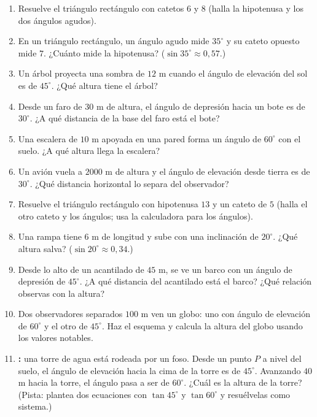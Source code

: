 \documentclass[12pt, letterpaper]{article}
\providecommand{\sen}{\sin}
\begin{document}
\begin{enumerate}[leftmargin=*, resume]
  \item \facil{} Resuelve el triángulo rectángulo con catetos $6$ y $8$ (halla la hipotenusa y los dos ángulos agudos).

  \item \facil{} En un triángulo rectángulo, un ángulo agudo mide $35^{\circ}$ y su cateto opuesto mide $7$. ¿Cuánto mide la hipotenusa? ($\sen 35^{\circ} \approx 0{,}57$.)

  \item \facil{} Un árbol proyecta una sombra de $12$ m cuando el ángulo de elevación del sol es de $45^{\circ}$. ¿Qué altura tiene el árbol?

  \item \medio{} Desde un faro de $30$ m de altura, el ángulo de depresión hacia un bote es de $30^{\circ}$. ¿A qué distancia de la base del faro está el bote?

  \item \medio{} Una escalera de $10$ m apoyada en una pared forma un ángulo de $60^{\circ}$ con el suelo. ¿A qué altura llega la escalera?

  \item \medio{} Un avión vuela a $2000$ m de altura y el ángulo de elevación desde tierra es de $30^{\circ}$. ¿Qué distancia horizontal lo separa del observador?

  \item \medio{} Resuelve el triángulo rectángulo con hipotenusa $13$ y un cateto de $5$ (halla el otro cateto y los ángulos; usa la calculadora para los ángulos).

  \item \dificil{} Una rampa tiene $6$ m de longitud y sube con una inclinación de $20^{\circ}$. ¿Qué altura salva? ($\sen 20^{\circ} \approx 0{,}34$.)

  \item \dificil{} Desde lo alto de un acantilado de $45$ m, se ve un barco con un ángulo de depresión de $45^{\circ}$. ¿A qué distancia del acantilado está el barco? ¿Qué relación observas con la altura?

  \item \dificil{} Dos observadores separados $100$ m ven un globo: uno con ángulo de elevación de $60^{\circ}$ y el otro de $45^{\circ}$. Haz el esquema y calcula la altura del globo usando los valores notables.

  \item \dificil{} \textbf{:} una torre de agua está rodeada por un foso. Desde un punto $P$ a nivel del suelo, el ángulo de elevación hacia la cima de la torre es de $45^{\circ}$. Avanzando $40$ m hacia la torre, el ángulo pasa a ser de $60^{\circ}$. ¿Cuál es la altura de la torre? (Pista: plantea dos ecuaciones con $\tan 45^{\circ}$ y $\tan 60^{\circ}$ y resuélvelas como sistema.)
\end{enumerate}
\end{document}
